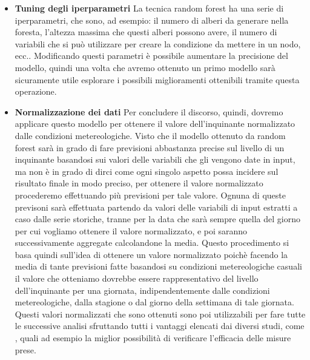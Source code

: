 \documentclass{article}
\begin{document}
\begin{itemize}
\item \textbf{Tuning degli iperparametri}
La tecnica random forest ha una serie di iperparametri, che sono, ad esempio: il numero di alberi da generare nella foresta, l'altezza massima che questi alberi possono avere, il numero di variabili che si può utilizzare per creare la condizione da mettere in un nodo, ecc..
Modificando questi parametri è possibile aumentare la precisione del modello, quindi una volta che avremo ottenuto un primo modello sarà sicuramente utile esplorare i possibili miglioramenti ottenibili tramite questa operazione.

\item \textbf{Normalizzazione dei dati} 
Per concludere il discorso, quindi, dovremo applicare questo modello per ottenere il valore dell'inquinante normalizzato dalle condizioni metereologiche. Visto che il modello ottenuto da random forest sarà in grado di fare previsioni abbastanza precise sul livello di un inquinante basandosi sui valori delle variabili che gli vengono date in input, ma non è in grado di dirci come ogni singolo aspetto possa incidere sul risultato finale in modo preciso, per ottenere il valore normalizzato procederemo effettuando più previsioni per tale valore. Ognuna di queste previsoni sarà effettuata partendo da valori delle variabili di input estratti a caso dalle serie storiche, tranne per la data che sarà sempre quella del giorno per cui vogliamo ottenere il valore normalizzato, e poi saranno successivamente aggregate calcolandone la media. Questo procedimento si basa quindi sull'idea di ottenere un valore normalizzato poichè facendo la media di tante previsioni fatte basandosi su condizioni metereologiche casuali il valore che otteniamo dovrebbe essere rappresentativo del livello dell'inquinante per una giornata, indipendentemente dalle condizioni metereologiche, dalla stagione o dal giorno della settimana di tale giornata.
Questi valori normalizzati che sono ottenuti sono poi utilizzabili per fare tutte le successive analisi sfruttando tutti i vantaggi elencati dai diversi studi, come \cite{hoogerbrugge2010trends}, quali ad esempio la miglior possibilità di verificare l'efficacia delle misure prese.
\end{itemize}
\end{document}
